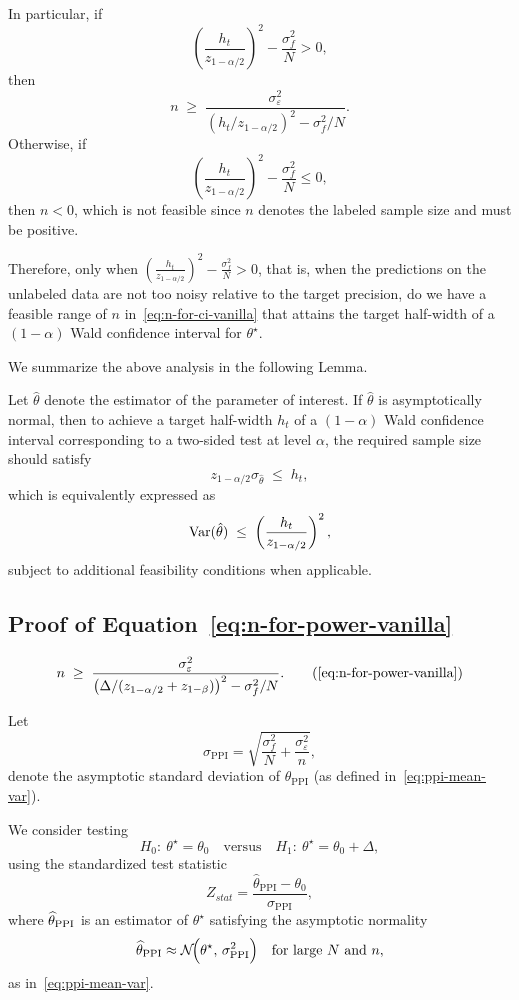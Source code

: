 \noindent
In particular, if
\[
\left(\frac{h_t}{z_{1-\alpha/2}}\right)^2 - \frac{\sigma_f^2}{N} > 0,\]
then\[
n \;\ge\; \frac{\sigma_\varepsilon^2}{(h_t / z_{1-\alpha/2})^2 - \sigma_f^2 / N}.
\]
Otherwise, if
\[\left(\frac{h_t}{z_{1-\alpha/2}}\right)^2 - \frac{\sigma_f^2}{N} \le 0,\]
then $n < 0$, which is not feasible since $n$ denotes the labeled sample size and must be positive.

\noindent
Therefore, only when $\left(\tfrac{h_t}{z_{1-\alpha/2}}\right)^2 - \tfrac{\sigma_f^2}{N} > 0$, that is, when the predictions on the unlabeled data are not too noisy relative to the target precision, do we have a feasible range of $n$ in~\eqref{eq:n-for-ci-vanilla} that attains the target half-width of a $(1-\alpha)$ Wald confidence interval for $\theta^\star$.

\noindent
We summarize the above analysis in the following Lemma.

\begin{lemma}
\label{lem:n-CI}
Let $\hat{\theta}$ denote the estimator of the parameter of interest. If $\hat{\theta}$ is asymptotically normal, then to achieve a target half-width $h_t$ of a $(1-\alpha)$ Wald confidence interval corresponding to a two-sided test at level $\alpha$, the required sample size should satisfy
\[z_{1-\alpha/2}\sigma_{\hat \theta}\;\le\;h_t,\]
which is equivalently expressed as
\[\mathrm{Var}(\hat{\theta}) \;\le\; \left(\frac{h_t}{z_{1-\alpha/2}}\right)^2,\]subject to additional feasibility conditions when applicable.
\end{lemma}

\subsection{Proof of Equation~\eqref{eq:n-for-power-vanilla}}
\label{subsec:n-for-power-vanilla}
\begin{equation}
n \;\ge\; \frac{\sigma_\varepsilon^2}{\big(\Delta/(z_{1-\alpha/2}+z_{1-\beta})\big)^2 - \sigma_f^2/N}.
\tag{\ref{eq:n-for-power-vanilla}}
\end{equation}

\noindent
Let
\[
\sigma_{\mathrm{PPI}} = 
\sqrt{\frac{\sigma_f^2}{N} + \frac{\sigma_\varepsilon^2}{n}},
\]
denote the asymptotic standard deviation of $\widehat{\theta}_{\mathrm{PPI}}$ 
(as defined in~\eqref{eq:ppi-mean-var}).

\noindent We consider testing
\[
H_0:\ \theta^\star=\theta_0
\quad\text{versus}\quad
H_1:\ \theta^\star=\theta_0+\Delta,
\]
using the standardized test statistic
\[
Z_{stat}=\frac{\widehat{\theta}_{\mathrm{PPI}}-\theta_0}{
\sigma_{\mathrm{PPI}}},
\]where $\widehat{\theta}_{\mathrm{PPI}}$ is an estimator of $\theta^\star$ satisfying the asymptotic normality
\[\widehat{\theta}_{\mathrm{PPI}}
\approx
\mathcal{N}\!\Big(
\theta^\star,\,
\sigma_{\mathrm{PPI}}^2
\Big)
\quad\text{for large $N$ and $n$},\]as in~\eqref{eq:ppi-mean-var}.

